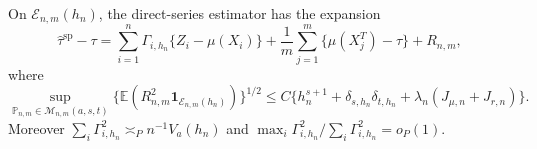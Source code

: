 On \(\mathcal E_{n,m}(h_n)\), the direct-series estimator has the expansion
\[
\widehat\tau^{\mathrm{sp}}-\tau
=\sum_{i=1}^n\Gamma_{i,h_n}\{Z_i-\mu(X_i)\}
+\frac1m\sum_{j=1}^m\{\mu(X_j^T)-\tau\}+R_{n,m},
\]
where
\[
\sup_{\mathbb P_{n,m}\in\mathcal M_{n,m}(a,s,t)}
\{\mathbb E(R_{n,m}^2\mathbf 1_{\mathcal E_{n,m}(h_n)})\}^{1/2}
\le C\{h_n^{s+1}+\delta_{s,h_n}\delta_{t,h_n}+\lambda_n(J_{\mu,n}+J_{r,n})\}.
\]
Moreover \(\sum_i\Gamma_{i,h_n}^2\asymp_P n^{-1}V_a(h_n)\) and \(\max_i\Gamma_{i,h_n}^2/\sum_i\Gamma_{i,h_n}^2=o_P(1)\).